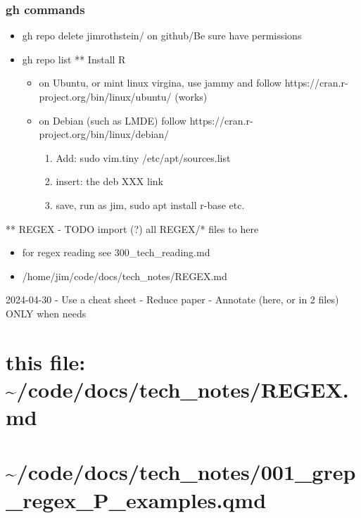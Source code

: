 \documentclass[
]{report}
\providecommand{\tightlist}{%
  \setlength{\itemsep}{0pt}\setlength{\parskip}{0pt}}\usepackage{longtable,booktabs,array}
\begin{document}
\subsubsection{gh commands}\label{gh-commands}

\begin{itemize}
\tightlist
\item
  gh repo delete jimrothstein/ on github/Be sure have permissions
\item
  gh repo list ** Install R

  \begin{itemize}
  \tightlist
  \item
    on Ubuntu, or mint linux virgina, use jammy and follow
    https://cran.r-project.org/bin/linux/ubuntu/ (works)\\
  \item
    on Debian (such as LMDE) follow
    https://cran.r-project.org/bin/linux/debian/

    \begin{enumerate}
    \def\labelenumi{(\arabic{enumi})}
    \tightlist
    \item
      Add: sudo vim.tiny /etc/apt/sources.list
    \item
      insert: the deb XXX link
    \item
      save, run as jim, sudo apt install r-base etc.
    \end{enumerate}
  \end{itemize}
\end{itemize}

** REGEX - TODO import (?) all REGEX/* files to here

\begin{itemize}
\tightlist
\item
  for regex reading see 300\_tech\_reading.md
\item
  /home/jim/code/docs/tech\_notes/REGEX.md
\end{itemize}

2024-04-30 - Use a cheat sheet - Reduce paper - Annotate (here, or in 2
files) ONLY when needs

\section{this file:
\textasciitilde/code/docs/tech\_notes/REGEX.md}\label{this-file-codedocstech_notesregex.md}

\section{\textasciitilde/code/docs/tech\_notes/001\_grep\_regex\_P\_examples.qmd}\label{codedocstech_notes001_grep_regex_p_examples.qmd}
\end{document}
